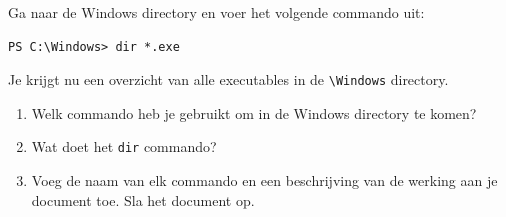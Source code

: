 Ga naar de Windows directory en voer het volgende commando uit:
\begin{lstlisting}[style=DOS]
PS C:\Windows> dir *.exe
\end{lstlisting}
Je krijgt nu een overzicht van alle executables in de \texttt{\textbackslash Windows} directory.
\begin{enumerate}
\item Welk commando heb je gebruikt om in de Windows directory te komen?
\item Wat doet het \texttt{dir} commando?
\item Voeg de naam van elk commando en een beschrijving van de werking aan je document toe. Sla het document op.
\end{enumerate}

